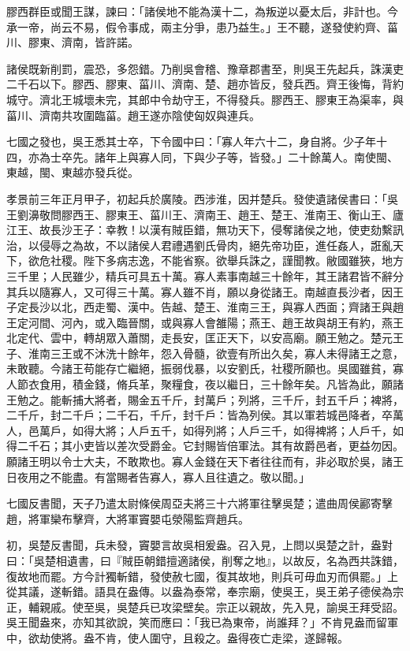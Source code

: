 \begin{pinyinscope}
膠西群臣或聞王謀，諫曰：「諸侯地不能為漢十二，為叛逆以憂太后，非計也。今承一帝，尚云不易，假令事成，兩主分爭，患乃益生。」王不聽，遂發使約齊、菑川、膠東、濟南，皆許諾。

諸侯既新削罰，震恐，多怨錯。乃削吳會稽、豫章郡書至，則吳王先起兵，誅漢吏二千石以下。膠西、膠東、菑川、濟南、楚、趙亦皆反，發兵西。齊王後悔，背約城守。濟北王城壞未完，其郎中令劫守王，不得發兵。膠西王、膠東王為渠率，與菑川、濟南共攻圍臨菑。趙王遂亦陰使匈奴與連兵。

七國之發也，吳王悉其士卒，下令國中曰：「寡人年六十二，身自將。少子年十四，亦為士卒先。諸年上與寡人同，下與少子等，皆發。」二十餘萬人。南使閩、東越，閩、東越亦發兵從。

孝景前三年正月甲子，初起兵於廣陵。西涉淮，因并楚兵。發使遺諸侯書曰：「吳王劉濞敬問膠西王、膠東王、菑川王、濟南王、趙王、楚王、淮南王、衡山王、廬江王、故長沙王子：幸教！以漢有賊臣錯，無功天下，侵奪諸侯之地，使吏劾繫訊治，以侵辱之為故，不以諸侯人君禮遇劉氏骨肉，絕先帝功臣，進任姦人，誑亂天下，欲危社稷。陛下多病志逸，不能省察。欲舉兵誅之，謹聞教。敝國雖狹，地方三千里；人民雖少，精兵可具五十萬。寡人素事南越三十餘年，其王諸君皆不辭分其兵以隨寡人，又可得三十萬。寡人雖不肖，願以身從諸王。南越直長沙者，因王子定長沙以北，西走蜀、漢中。告越、楚王、淮南三王，與寡人西面；齊諸王與趙王定河間、河內，或入臨晉關，或與寡人會雒陽；燕王、趙王故與胡王有約，燕王北定代、雲中，轉胡眾入蕭關，走長安，匡正天下，以安高廟。願王勉之。楚元王子、淮南三王或不沐洗十餘年，怨入骨髓，欲壹有所出久矣，寡人未得諸王之意，未敢聽。今諸王苟能存亡繼絕，振弱伐暴，以安劉氏，社稷所願也。吳國雖貧，寡人節衣食用，積金錢，脩兵革，聚糧食，夜以繼日，三十餘年矣。凡皆為此，願諸王勉之。能斬捕大將者，賜金五千斤，封萬戶；列將，三千斤，封五千戶；裨將，二千斤，封二千戶；二千石，千斤，封千戶：皆為列侯。其以軍若城邑降者，卒萬人，邑萬戶，如得大將；人戶五千，如得列將；人戶三千，如得裨將；人戶千，如得二千石；其小吏皆以差次受爵金。它封賜皆倍軍法。其有故爵邑者，更益勿因。願諸王明以令士大夫，不敢欺也。寡人金錢在天下者往往而有，非必取於吳，諸王日夜用之不能盡。有當賜者告寡人，寡人且往遺之。敬以聞。」

七國反書聞，天子乃遣太尉條侯周亞夫將三十六將軍往擊吳楚；遣曲周侯酈寄擊趙，將軍欒布擊齊，大將軍竇嬰屯滎陽監齊趙兵。

初，吳楚反書聞，兵未發，竇嬰言故吳相爰盎。召入見，上問以吳楚之計，盎對曰：「吳楚相遺書，曰『賊臣朝錯擅適諸侯，削奪之地』，以故反，名為西共誅錯，復故地而罷。方今計獨斬錯，發使赦七國，復其故地，則兵可毋血刃而俱罷。」上從其議，遂斬錯。語具在盎傳。以盎為泰常，奉宗廟，使吳王，吳王弟子德侯為宗正，輔親戚。使至吳，吳楚兵已攻梁壁矣。宗正以親故，先入見，諭吳王拜受詔。吳王聞盎來，亦知其欲說，笑而應曰：「我已為東帝，尚誰拜？」不肯見盎而留軍中，欲劫使將。盎不肯，使人圍守，且殺之。盎得夜亡走梁，遂歸報。


\end{pinyinscope}
